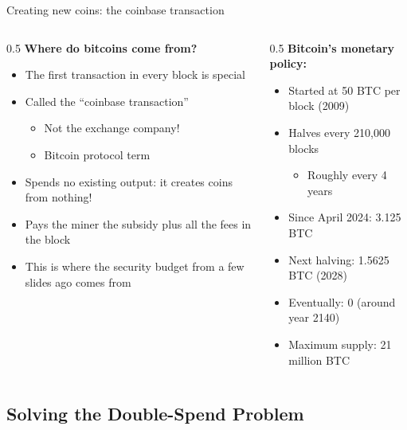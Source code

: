 \ifdefined\PRESENTATION\else\PassOptionsToClass{handout}{beamer}\fi\documentclass[aspectratio=169, lualatex]{beamer}
\begin{document}
\begin{frame}{Creating new coins: the coinbase transaction}
	\begin{columns}[c]
		\begin{column}{0.5\textwidth}
			\textbf{Where do bitcoins come from?}
			\begin{itemize}
				\item The first transaction in every block is special
				\item Called the ``coinbase transaction''
				      \begin{itemize}
					      \item Not the exchange company!
					      \item Bitcoin protocol term
				      \end{itemize}
				\item Spends no existing output: it creates coins from nothing!
				\item Pays the miner the subsidy plus all the fees in the block
				\item This is where the security budget from a few slides ago comes from
			\end{itemize}
		\end{column}
		\begin{column}{0.5\textwidth}
			\textbf{Bitcoin's monetary policy:}
			\begin{itemize}
				\item Started at 50 BTC per block (2009)
				\item Halves every 210,000 blocks
				      \begin{itemize}
					      \item Roughly every 4 years
				      \end{itemize}
				\item Since April 2024: 3.125 BTC
				\item Next halving: 1.5625 BTC (2028)
				\item Eventually: 0 (around year 2140)
				\item Maximum supply: 21 million BTC
			\end{itemize}
		\end{column}
	\end{columns}
\end{frame}

\subsection{Solving the Double-Spend Problem}
\end{document}
